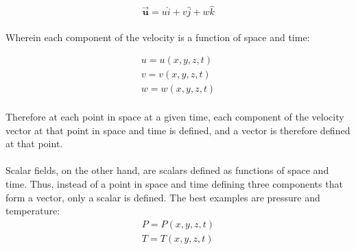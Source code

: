 \documentclass[11pt]{article}
\begin{document}
\begin{equation*}
    \vec{\bm{u}} = u\hat{i} + v\hat{j} + w\hat{k}
\end{equation*}\\
\noindent
Wherein each component of the velocity is a function of space and time:


\begin{eqnarray*}
    u = u(x, y, z, t)\\
    v = v(x, y, z, t)\\
    w = w(x, y, z, t)
\end{eqnarray*}\\
\noindent
Therefore at each point in space at a given time, each component of the velocity vector at that point in space and time is defined, and a vector is therefore defined at that point.\\ \\
\noindent
Scalar fields, on the other hand, are scalars defined as functions of space and time. Thus, instead of a point in space and time defining three components that form a vector, only a scalar is defined. The best examples are pressure and temperature:
\begin{eqnarray*}
    P = P(x, y, z, t)\\
    T = T(x, y, z, t)\\
\end{eqnarray*}
\end{document}
